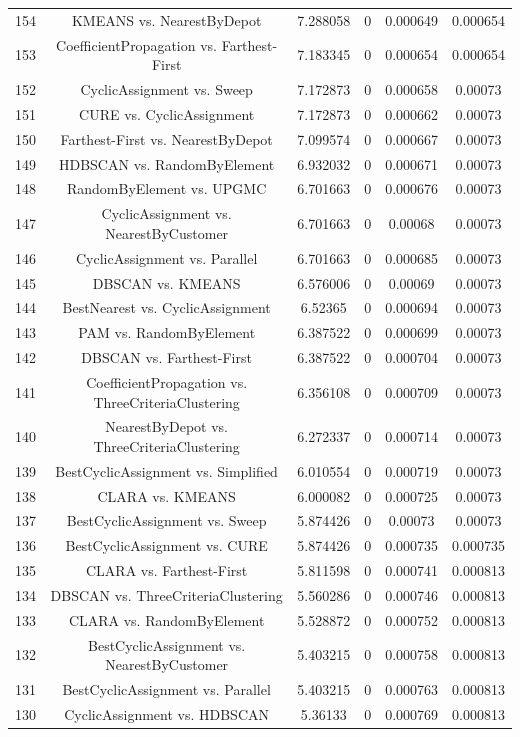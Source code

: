 \documentclass[a4paper,10pt]{article}
\begin{document}
\begin{landscape}
\begin{table}[!htp]
\begin{tabular}{cccccc}
154&KMEANS vs. NearestByDepot&7.288058&0&0.000649&0.000654\\
153&CoefficientPropagation vs. Farthest-First&7.183345&0&0.000654&0.000654\\
152&CyclicAssignment vs. Sweep&7.172873&0&0.000658&0.00073\\
151&CURE vs. CyclicAssignment&7.172873&0&0.000662&0.00073\\
150&Farthest-First vs. NearestByDepot&7.099574&0&0.000667&0.00073\\
149&HDBSCAN vs. RandomByElement&6.932032&0&0.000671&0.00073\\
148&RandomByElement vs. UPGMC&6.701663&0&0.000676&0.00073\\
147&CyclicAssignment vs. NearestByCustomer&6.701663&0&0.00068&0.00073\\
146&CyclicAssignment vs. Parallel&6.701663&0&0.000685&0.00073\\
145&DBSCAN vs. KMEANS&6.576006&0&0.00069&0.00073\\
144&BestNearest vs. CyclicAssignment&6.52365&0&0.000694&0.00073\\
143&PAM vs. RandomByElement&6.387522&0&0.000699&0.00073\\
142&DBSCAN vs. Farthest-First&6.387522&0&0.000704&0.00073\\
141&CoefficientPropagation vs. ThreeCriteriaClustering&6.356108&0&0.000709&0.00073\\
140&NearestByDepot vs. ThreeCriteriaClustering&6.272337&0&0.000714&0.00073\\
139&BestCyclicAssignment vs. Simplified&6.010554&0&0.000719&0.00073\\
138&CLARA vs. KMEANS&6.000082&0&0.000725&0.00073\\
137&BestCyclicAssignment vs. Sweep&5.874426&0&0.00073&0.00073\\
136&BestCyclicAssignment vs. CURE&5.874426&0&0.000735&0.000735\\
135&CLARA vs. Farthest-First&5.811598&0&0.000741&0.000813\\
134&DBSCAN vs. ThreeCriteriaClustering&5.560286&0&0.000746&0.000813\\
133&CLARA vs. RandomByElement&5.528872&0&0.000752&0.000813\\
132&BestCyclicAssignment vs. NearestByCustomer&5.403215&0&0.000758&0.000813\\
131&BestCyclicAssignment vs. Parallel&5.403215&0&0.000763&0.000813\\
130&CyclicAssignment vs. HDBSCAN&5.36133&0&0.000769&0.000813\\

\end{tabular}
\end{table}
\end{landscape}
\end{document}
